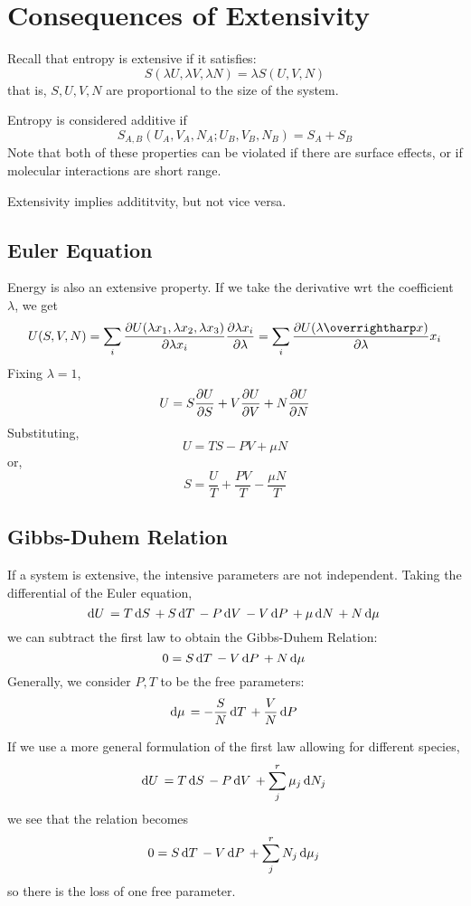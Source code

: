 \chapter{Consequences of Extensivity}
Recall that entropy is extensive if it satisfies:
\[S(\lambda U, \lambda V, \lambda N)=\lambda S(U,V,N)\]
that is, \(S,U,V,N\) are proportional to the size of the system.

Entropy is considered additive if
\[S_{A,B}(U_A,V_A,N_A; U_B,V_B, N_B)=S_A+S_B\]
Note that both of these properties can be violated if there are surface effects, or if molecular interactions are short range.

Extensivity implies addititvity, but not vice versa.

\section{Euler Equation}
Energy is also an extensive property. If we take the derivative wrt the coefficient \(\lambda\), we get
\[U(S,V,N)=\sum_i \pder{U(\lambda x_1, \lambda x_2, \lambda x_3)}{\lambda x_i}\pder{\lambda x_i}{\lambda}=\sum_i\pder{U(\lambda \vv{x})}{\lambda}x_i\]
Fixing \(\lambda = 1\), 
\[U=S\frac{\partial U}{\partial S}+V\frac{\partial U}{\partial V}+N\frac{\partial U}{\partial N}\]
Substituting,
\begin{equation}
	U=TS-PV+\mu N	\label{eq12:euler}
\end{equation}
or,
\[S=\frac{U}{T}+\frac{PV}{T}-\frac{\mu N}{T}\]

\section{Gibbs-Duhem Relation}
If a system is extensive, the intensive parameters are not independent. Taking the differential of the Euler equation,
\[\d U = T\d{S}+S\d{T}-P\d{V}-V\d{P}+\mu\d{N}+N\d{\mu}\]
we can subtract the first law to obtain the Gibbs-Duhem Relation:
\begin{equation}
0=S\d{T}-V\d{P}+N\d{\mu}
\end{equation}
Generally, we consider \(P,T\) to be the free parameters:
\begin{equation}
	\d{\mu}=-\frac{S}{N}\d{T}+\frac{V}{N}\d{P}
\end{equation}

If we use a more general formulation of the first law allowing for different species,
\[\d U = T\d{S}-P\d{V}+\sum_j^r\mu_j\d{N_j}\]
we see that the relation becomes
\[0 = S\d{T}-V\d{P}+\sum_j^r N_j \d{\mu_j}\]
so there is the loss of one free parameter.

